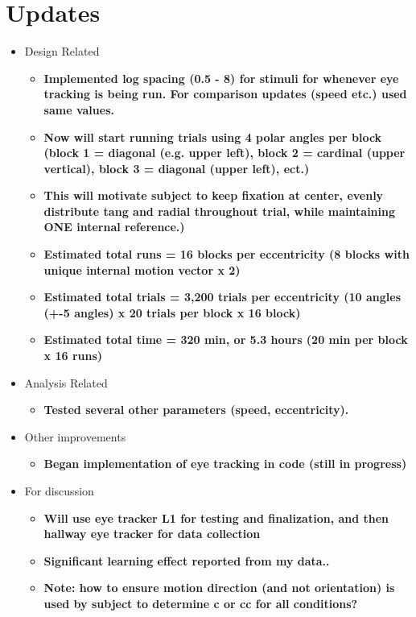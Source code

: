 \documentclass[11pt]{article} %
\begin{document}
\newpage
\section{Updates} 
\begin{itemize}
\item Design Related
	\begin{itemize}
	\item \textbf{Implemented log spacing (0.5 - 8) for stimuli for whenever eye tracking is being run. For comparison updates (speed etc.) used same values.}
	\item \textbf{Now will start running trials using 4 polar angles per block (block 1 = diagonal (e.g. upper left), block 2 = cardinal (upper vertical), block 3 = diagonal (upper left), ect.)}
	\item \textbf{This will motivate subject to keep fixation at center, evenly distribute tang and radial throughout trial, while maintaining ONE internal reference.)}
	\item \textbf{Estimated total runs = 16 blocks per eccentricity (8 blocks with unique internal motion vector x 2)}
	\item \textbf{Estimated total trials = 3,200 trials per eccentricity (10 angles (+-5 angles) x 20 trials per block x 16 block)}
	\item \textbf{Estimated total time = 320 min, or 5.3 hours (20 min per block x 16 runs)}
	\end{itemize}
\item Analysis Related
	\begin{itemize}
	\item \textbf{Tested several other parameters (speed, eccentricity).}
	\end{itemize}
\item Other improvements
	\begin{itemize}
	\item \textbf{Began implementation of eye tracking in code (still in progress)}
	\end{itemize}
\item For discussion
	\begin{itemize}
	\item \textbf{Will use eye tracker L1 for testing and finalization, and then hallway eye tracker for data collection}
	\item \textbf{Significant learning effect reported from my data..}
	\item \textbf{Note: how to ensure motion direction (and not orientation) is used by subject to determine c or cc for all conditions?}

\end{itemize}
\end{itemize}
\end{document}
